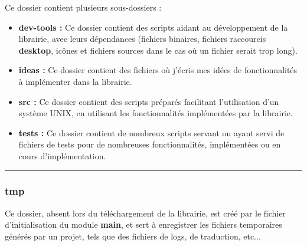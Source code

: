\documentclass[a4paper,10pt]{article}
\begin{document}
\begin{justify}
    Ce dossier contient plusieurs sous-dossiers :\\\mbox{}

    \begin{itemize}
        \item \textbf{\color{path}dev-tools\color{text} :} Ce dossier contient des scripts aidant au développement de la librairie, avec leurs dépendances (fichiers binaires, fichiers raccourcis \textbf{desktop}, icônes et fichiers sources dans le cas où un fichier serait trop long).\\\mbox{}

        \item \textbf{\color{path}ideas\color{text} :} Ce dossier contient des fichiers où j'écris mes idées de fonctionnalités à implémenter dans la librairie.\\\mbox{}

        \item \textbf{\color{path}src\color{text} :} Ce dossier contient des scripts préparés facilitant l'utilisation d'un système UNIX, en utilisant les fonctionnalités implémentées par la librairie.\\\mbox{}

        \item \textbf{\color{path}tests\color{text} :} Ce dossier contient de nombreux scripts servant ou ayant servi de fichiers de tests pour de nombreuses fonctionnalités, implémentées ou en cours d'implémentation.
    \end{itemize}
\end{justify}


\color{sec3}\par\noindent\rule{\textwidth}{0.4pt}\color{text}

\color{sec3}
\subsubsection{tmp}\color{text}

\begin{justify}
    Ce dossier, absent lors du téléchargement de la librairie, est créé par le fichier d'initialisation du module \textbf{main}, et sert à enregistrer les fichiers temporaires générés par un projet, tels que des fichiers de logs, de traduction, etc...
\end{justify}

\end{document}
